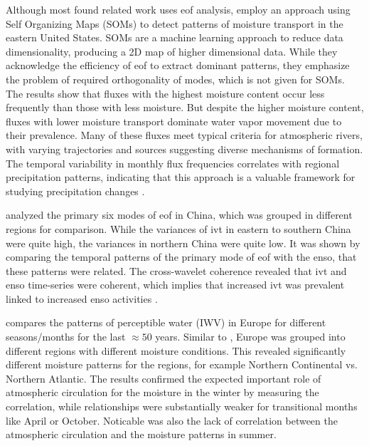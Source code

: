 Although most found related work uses \ac{eof} analysis, \citeauthor{teale_patterns_2020} employ an approach using Self Organizing Maps (SOMs) to detect patterns of moisture transport in the eastern United States.
SOMs are a machine learning approach to reduce data dimensionality, producing a 2D map of higher dimensional data.
While they acknowledge the efficiency of \ac{eof} to extract dominant patterns, they emphasize the problem of required orthogonality of modes, which is not given for SOMs. 
The results show that fluxes with the highest moisture content occur less frequently than those with less moisture. 
But despite the higher moisture content, fluxes with lower moisture transport dominate water vapor movement due to their prevalence. 
Many of these fluxes meet typical criteria for atmospheric rivers, with varying trajectories and sources suggesting diverse mechanisms of formation. 
The temporal variability in monthly flux frequencies correlates with regional precipitation patterns, indicating that this approach is a valuable framework for studying precipitation changes \cite{teale_patterns_2020}.



\citeauthor{ayantobo_integrated_2022} analyzed the primary six modes of \ac{eof} in China, which was grouped in different regions for comparison. 
While the variances of \ac{ivt} in eastern to southern China were quite high, the variances in northern China were quite low. 
It was shown by comparing the temporal patterns of the primary mode of \ac{eof} with the \ac{enso}, that these patterns were related. 
The cross-wavelet coherence revealed that \ac{ivt} and \ac{enso} time-series were coherent, which implies that increased \ac{ivt} was prevalent linked to increased \ac{enso} activities \cite{ayantobo_integrated_2022}. 


\citeauthor{wypych_atmospheric_2018} compares the patterns of perceptible water (IWV) in Europe for different seasons/months for the last $\approx50$ years. 
Similar to \cite{ayantobo_integrated_2022}, Europe was grouped into different regions with different moisture conditions. 
This revealed significantly different moisture patterns for the regions, for example Northern Continental vs. Northern Atlantic.
The results confirmed the expected important role of atmospheric circulation for the moisture in the winter by measuring the correlation, while relationships were substantially weaker for transitional months like April or October. 
Noticable was also the lack of correlation between the atmospheric circulation and the moisture patterns in summer. 


